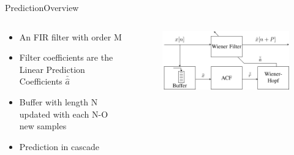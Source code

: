 \begin{frame}{Prediction}{Overview}
	\begin{columns}
		\begin{column}{0.5\textwidth}
			\begin{itemize}
				\item An FIR filter with order M
				\item Filter coefficients are the Linear Prediction Coefficients $\bar{\hat{a}}$
				\item Buffer with length N updated with each N-O new samples
				\item Prediction in cascade 
			\end{itemize}
		\end{column}
		\begin{column}{0.5\textwidth} 
			\begin{figure}
				\includegraphics[width=\textwidth]{figures/WienerHopf}
			\end{figure}
		\end{column}
	\end{columns}
\end{frame}


